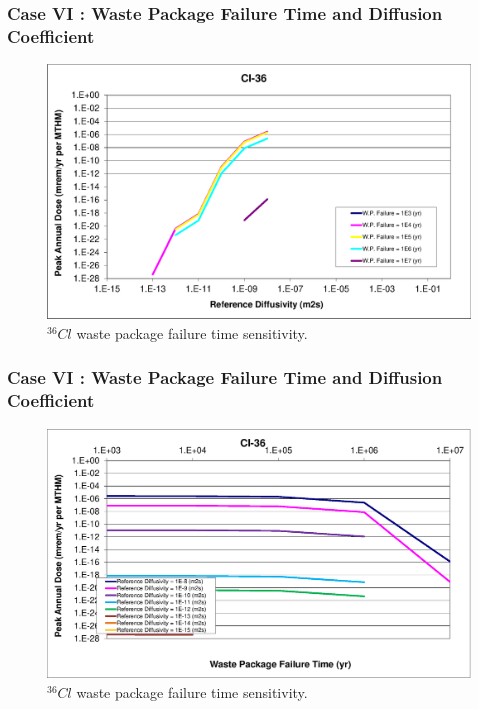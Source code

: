 \begin{frame}[c]
  \frametitle{Case VI : Waste Package Failure Time and Diffusion Coefficient}

\begin{figure}[ht!]
\centering
\includegraphics[width=\linewidth]{WPFailExtended/Cl-36.eps}
\caption{$^{36}Cl$ waste package failure time sensitivity. }
\label{fig:WPFailCl36}
\end{figure}
\end{frame}

\begin{frame}[c]
  \frametitle{Case VI : Waste Package Failure Time and Diffusion Coefficient}

\begin{figure}[ht!]
\centering
\includegraphics[width=\linewidth]{WPFailExtended/Cl-36-WPFail.eps}
\caption{$^{36}Cl$ waste package failure time sensitivity. }
\label{fig:WPFailPuDaughters}
\end{figure}

\end{frame}


